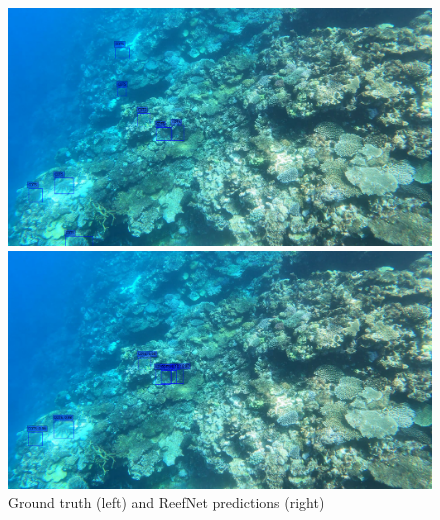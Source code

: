 \documentclass{article}
\begin{document}
\begin{figure}
    \begin{minipage}{0.48\textwidth}
        \includegraphics[width=\textwidth]{ground_truth.png}
    \end{minipage}
    \begin{minipage}{0.48\textwidth}
        \includegraphics[width=\textwidth]{35.png}
    \end{minipage}
    \caption{Ground truth (left) and ReefNet predictions (right)}
    \label{fig:sample_visualizations}
\end{figure}
\end{document}
